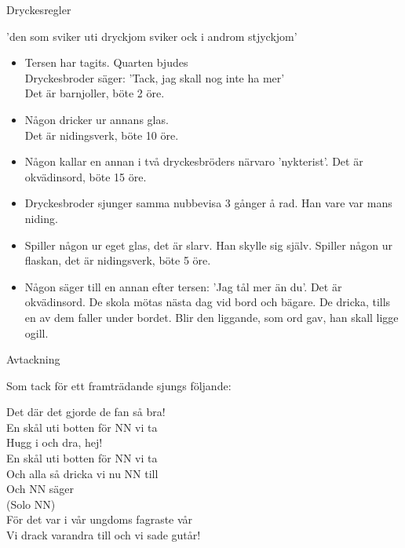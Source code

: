 \begin{flushleft}
{\Huge Dryckesregler\\}
\end{flushleft}
{\large
'den som sviker uti dryckjom sviker ock i androm stjyckjom'
\begin{itemize}
\item Tersen har tagits. Quarten bjudes\\ Dryckesbroder säger: 'Tack, jag 
skall nog inte ha mer'\\ Det  är barnjoller, böte 2 öre.
\item Någon dricker ur annans glas. \\Det är nidingsverk, böte 10 öre.
\item Någon kallar en annan i två dryckesbröders närvaro 'nykterist'. 
Det är okvädinsord, böte 15 öre.
\item Dryckesbroder sjunger samma nubbevisa 3 gånger å rad. Han vare var 
mans niding.
\item Spiller någon ur eget glas, det är slarv. Han skylle sig själv. 
Spiller någon ur flaskan, det är nidingsverk, böte 5 öre.
\item Någon säger till en annan efter tersen: 'Jag tål mer än du'. Det 
är okvädinsord. De skola mötas nästa dag vid bord och bägare. De 
dricka, tills en av dem faller under bordet. Blir den liggande, som ord 
gav, han skall ligge ogill.
\end{itemize}
}

\begin{flushleft}
{\Huge Avtackning\\}
\end{flushleft}
{\large
Som tack för ett framträdande sjungs följande:

\begin{flushleft}
Det där det gjorde de fan så bra!\\
En skål uti botten för NN vi ta\\
\repopen Hugg i och dra, hej! \repclose\\
En skål uti botten för NN vi ta\\
Och alla så dricka vi nu NN till\\
Och NN säger\\
(Solo NN)\\
För det var i vår ungdoms fagraste vår\\
Vi drack varandra till och vi sade gutår!\\
\end{flushleft}
}

































